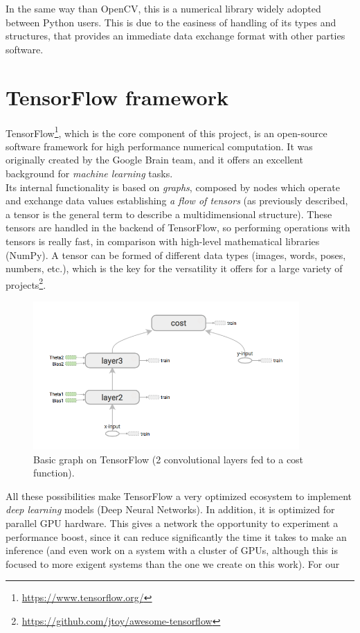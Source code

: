 In the same way than OpenCV, this is a numerical library widely adopted between Python users. This is due to the easiness of handling of its types and structures, that provides an immediate data exchange format with other parties software.



\section{TensorFlow framework}
	\label{sec:3_tensorflow}
	TensorFlow\footnote{\url{https://www.tensorflow.org/}}, which is the core component of this project, is an open-source software framework for high performance numerical computation. It was originally created by the Google Brain team, and it offers an excellent background for \emph{machine learning} tasks.\\
	
	Its internal functionality is based on \emph{graphs}, composed by nodes which operate and exchange data values establishing \emph{a flow of tensors} (as previously described, a tensor is the general term to describe a multidimensional structure). These tensors are handled in the backend of TensorFlow, so performing operations with tensors is really fast, in comparison with high-level mathematical libraries (NumPy). A tensor can be formed of different data types (images, words, poses, numbers, etc.), which is the key for the versatility it offers for a large variety of projects\footnote{\url{https://github.com/jtoy/awesome-tensorflow}}.\\
	
	\begin{figure}[h]
		\centering
		\includegraphics[width=4in]{images/tf_graph}
		\caption{Basic graph on TensorFlow (2 convolutional layers fed to a cost function).}
		\label{fig:3_tf_graph}
	\end{figure}
	
	All these possibilities make TensorFlow a very optimized ecosystem to implement \emph{deep learning} models (Deep Neural Networks). In addition, it is optimized for parallel GPU hardware. This gives a network the opportunity to experiment a performance boost, since it can reduce significantly the time it takes to make an inference (and even work on a system with a cluster of GPUs, although this is focused to more exigent systems than the one we create on this work). For our\\
	
